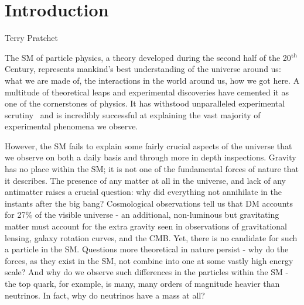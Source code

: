 \chapter{Introduction}
\label{chap:intro}



{Terry Pratchet}

The \ac{SM} of particle physics, a theory developed during the second half of the 20$^{\rm th}$ Century, represents mankind's best understanding of the universe around us: what we are made of, the interactions in the world around us, how we got here. 
A multitude of theoretical leaps and experimental discoveries have cemented it as one of the cornerstones of physics. 
It has withstood unparalleled experimental scrutiny~\cite{PDG} and is incredibly successful at explaining the vast majority of experimental phenomena we observe.

However, the \ac{SM} fails to explain some fairly crucial aspects of the universe that we observe on both a daily basis and through more in depth inspections. 
Gravity has no place within the \ac{SM}; it is not one of the fundamental forces of nature that it describes. 
The presence of any matter at all in the universe, and lack of any antimatter raises a crucial question: why did everything not annihilate in the instants after the big bang?
Cosmological observations tell us that \ac{DM} accounts for 27\% of the visible universe - an additional, non-luminous but gravitating matter must account for the extra gravity seen in observations of gravitational lensing, galaxy rotation curves, and the \ac{CMB}.
Yet, there is no candidate for such a particle in the \ac{SM}. 
Questions more theoretical in nature persist - why do the forces, as they exist in the \ac{SM}, not combine into one at some vastly high energy scale? 
And why do we observe such differences in the particles within the \ac{SM} - the top quark, for example, is many, many orders of magnitude heavier than neutrinos. In fact, why do neutrinos have a mass at all?

